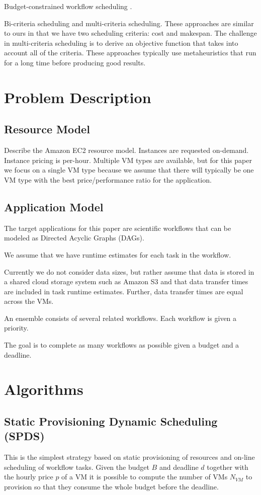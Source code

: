 \documentclass{sig-alternate}
\begin{document}
Budget-constrained workflow scheduling \cite{Sakellariou2007}.

Bi-criteria scheduling and multi-criteria scheduling. These approaches are similar to ours in that we have two scheduling criteria: cost and makespan. The challenge in multi-criteria scheduling is to derive an objective function that takes into account all of the criteria. These approaches typically use metaheuristics that run for a long time before producing good results.

\section{Problem Description}
\subsection{Resource Model}
Describe the Amazon EC2 resource model. Instances are requested on-demand. Instance pricing is per-hour. Multiple VM types are available, but for this paper we focus on a single VM type because we assume that there will typically be one VM type with the best price/performance ratio for the application.

\subsection{Application Model}
The target applications for this paper are scientific workflows that can be modeled as Directed Acyclic Graphs (DAGs).

We assume that we have runtime estimates for each task in the workflow.

Currently we do not consider data sizes, but rather assume that data is stored in a shared cloud storage system such as Amazon S3 and that data transfer times are included in task runtime estimates. Further, data transfer times are equal across the VMs.

An ensemble consists of several related workflows. Each workflow is given a priority.

The goal is to complete as many workflows as possible given a budget and a deadline.

\section{Algorithms}

\subsection{Static Provisioning Dynamic Scheduling\\
(SPDS) }
\label{sec:spds}
This is the simplest strategy based on static provisioning of resources and
on-line scheduling of workflow tasks. Given the budget $B$ and deadline $d$
together with the hourly price $p$ of a VM it is possible to compute the number
of VMs $N_{VM}$ to provision so that they consume the whole budget before the
deadline. 
\end{document}
